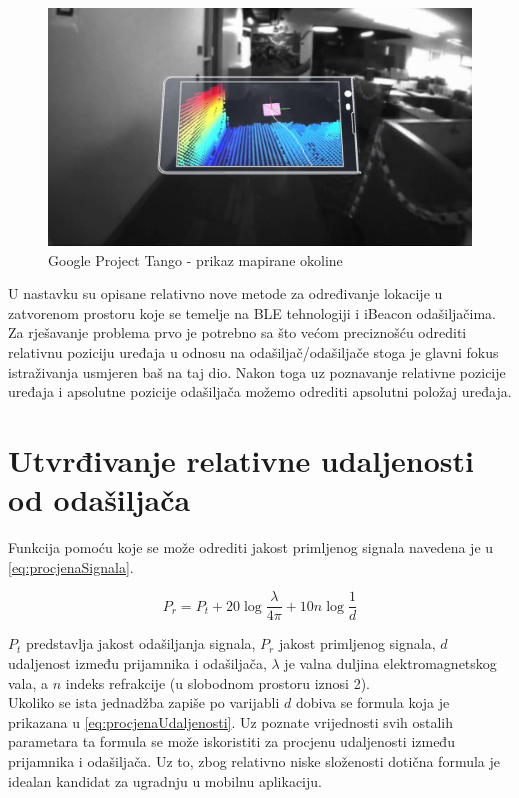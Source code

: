 \begin{figure}[H]
    \centering
    \includegraphics[scale=0.24]{pictures/tango2}
    \caption{Google Project Tango - prikaz mapirane okoline}
\end{figure}

U nastavku su opisane relativno nove metode za određivanje lokacije u zatvorenom prostoru koje se temelje na BLE tehnologiji i iBeacon odašiljačima.
Za rješavanje problema prvo je potrebno sa što većom preciznošću odrediti relativnu poziciju uređaja u odnosu na odašiljač/odašiljače stoga je glavni fokus istraživanja usmjeren baš na taj dio. 
Nakon toga uz poznavanje relativne pozicije uređaja i apsolutne pozicije odašiljača možemo odrediti apsolutni položaj uređaja.

\section{Utvrđivanje relativne udaljenosti od odašiljača}

Funkcija pomoću koje se može odrediti jakost primljenog signala navedena je u \eqref{eq:procjenaSignala}.

\begin{equation}
	\label{eq:procjenaSignala}
	P_r = P_t + 20\log{\frac{\lambda}{4\pi}} + 10n\log{\frac{1}{d}}
\end{equation}

$P_t$ predstavlja jakost odašiljanja signala, $P_r$ jakost primljenog signala, $d$ udaljenost između prijamnika i odašiljača, $\lambda$ je valna duljina elektromagnetskog vala, a $n$ indeks refrakcije (u slobodnom prostoru iznosi 2).
\\

Ukoliko se ista jednadžba zapiše po varijabli $d$ dobiva se formula koja je prikazana u \eqref{eq:procjenaUdaljenosti}. 
Uz poznate vrijednosti svih ostalih parametara ta formula se može iskoristiti za procjenu udaljenosti između prijamnika i odašiljača.
Uz to, zbog relativno niske složenosti dotična formula je idealan kandidat za ugradnju u mobilnu aplikaciju.


